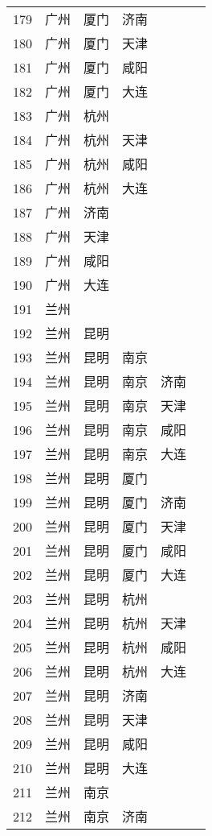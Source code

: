 \begin{footnotesize}
\begin{longtable}{cccccc}
        179	& 广州  & 厦门  & 济南 \\
        180	& 广州  & 厦门  & 天津 \\
        181	& 广州  & 厦门  & 咸阳 \\
        182	& 广州  & 厦门  & 大连 \\
        183	& 广州  & 杭州 \\
        184	& 广州  & 杭州  & 天津 \\
        185	& 广州  & 杭州  & 咸阳 \\
        186	& 广州  & 杭州  & 大连 \\
        187	& 广州  & 济南 \\
        188	& 广州  & 天津 \\
        189	& 广州  & 咸阳 \\
        190	& 广州  & 大连 \\
        191	& 兰州 \\
        192	& 兰州  & 昆明 \\
        193	& 兰州  & 昆明  & 南京 \\
        194	& 兰州  & 昆明  & 南京  & 济南 \\
        195	& 兰州  & 昆明  & 南京  & 天津 \\
        196	& 兰州  & 昆明  & 南京  & 咸阳 \\
        197	& 兰州  & 昆明  & 南京  & 大连 \\
        198	& 兰州  & 昆明  & 厦门 \\
        199	& 兰州  & 昆明  & 厦门  & 济南 \\
        200	& 兰州  & 昆明  & 厦门  & 天津 \\
        201	& 兰州  & 昆明  & 厦门  & 咸阳 \\
        202	& 兰州  & 昆明  & 厦门  & 大连 \\
        203	& 兰州  & 昆明  & 杭州 \\
        204	& 兰州  & 昆明  & 杭州  & 天津 \\
        205	& 兰州  & 昆明  & 杭州  & 咸阳 \\
        206	& 兰州  & 昆明  & 杭州  & 大连 \\
        207	& 兰州  & 昆明  & 济南 \\
        208	& 兰州  & 昆明  & 天津 \\
        209	& 兰州  & 昆明  & 咸阳 \\
        210	& 兰州  & 昆明  & 大连 \\
        211	& 兰州  & 南京 \\
        212	& 兰州  & 南京  & 济南 \\

\end{longtable}
\end{footnotesize}
